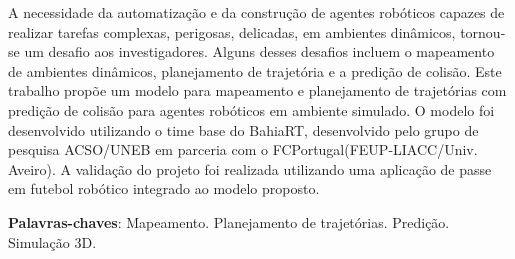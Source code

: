 \begin{resumo}

A necessidade da automatização e da construção de agentes robóticos capazes de realizar tarefas complexas, perigosas, 
delicadas, em ambientes din\^amicos, tornou-se um desafio aos investigadores. Alguns desses desafios incluem o mapeamento 
de ambientes din\^amicos, planejamento de trajetória e a predição de colisão. Este trabalho propõe um modelo 
para mapeamento e planejamento de trajetórias com predição de colisão para agentes robóticos em ambiente simulado. O modelo 
foi desenvolvido utilizando o time base do BahiaRT, desenvolvido pelo grupo de pesquisa ACSO/UNEB em parceria com o 
FCPortugal(FEUP-LIACC/Univ. Aveiro). A validação do projeto foi realizada utilizando uma aplicação de passe em futebol 
robótico integrado ao modelo proposto.

\textbf{Palavras-chaves}: Mapeamento. Planejamento de trajetórias. Predição. Simula\c{c}\~ao 3D.
\end{resumo}	
